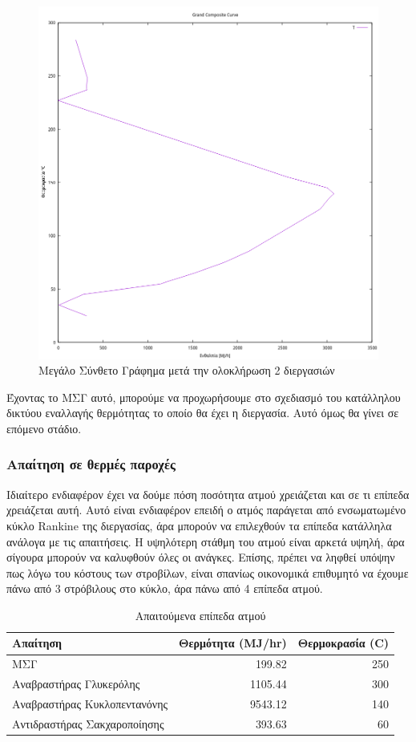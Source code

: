 \documentclass[11pt]{article}
\begin{document}
\begin{figure}[htbp]
\centering
\includegraphics[width=.9\linewidth]{Diagrams/grand_composite_curve_4.png}
\caption{Μεγάλο Σύνθετο Γράφημα μετά την ολοκλήρωση 2 διεργασιών}
\end{figure}

Έχοντας το ΜΣΓ αυτό, μπορούμε να προχωρήσουμε στο σχεδιασμό του κατάλληλου δικτύου εναλλαγής θερμότητας το οποίο θα έχει η διεργασία. Αυτό όμως θα γίνει σε επόμενο στάδιο.

\pagebreak

\subsubsection{Απαίτηση σε θερμές παροχές}
\label{sec:org1a7312d}
Ιδιαίτερο ενδιαφέρον έχει να δούμε πόση ποσότητα ατμού χρειάζεται και σε τι επίπεδα χρειάζεται αυτή. Αυτό είναι ενδιαφέρον επειδή ο ατμός παράγεται από ενσωματωμένο κύκλο Rankine της διεργασίας, άρα μπορούν να επιλεχθούν τα επίπεδα κατάλληλα ανάλογα με τις απαιτήσεις. Η υψηλότερη στάθμη του ατμού είναι αρκετά υψηλή, άρα σίγουρα μπορούν να καλυφθούν όλες οι ανάγκες. Επίσης, πρέπει να ληφθεί υπόψην πως λόγω του κόστους των στροβίλων, είναι σπανίως οικονομικά επιθυμητό να έχουμε πάνω από 3 στρόβιλους στο κύκλο, άρα πάνω από 4 επίπεδα ατμού.

\begin{table}[htbp]
\caption{Απαιτούμενα επίπεδα ατμού}
\centering
\begin{tabular}{lrr}
Απαίτηση & Θερμότητα (MJ/hr) & Θερμοκρασία (C)\\
\hline
ΜΣΓ & 199.82 & 250\\
Αναβραστήρας Γλυκερόλης & 1105.44 & 300\\
Αναβραστήρας Κυκλοπεντανόνης & 9543.12 & 140\\
Αντιδραστήρας Σακχαροποίησης & 393.63 & 60\\
\end{tabular}
\end{table}
\end{document}
